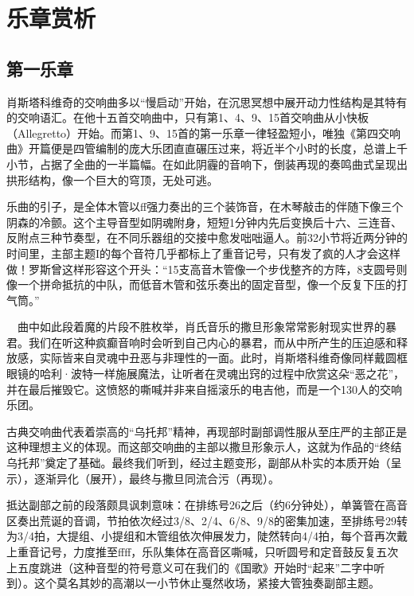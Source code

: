 \documentclass[a4paper,left=2.5cm,right=2.5cm,11pt]{article}
\begin{document}
\section{乐章赏析}
\subsection{第一乐章}
	肖斯塔科维奇的交响曲多以“慢启动”开始，在沉思冥想中展开动力性结构是其特有的交响语汇。在他十五首交响曲中，只有第1、4、9、15首交响曲从小快板（Allegretto）开始。而第1、9、15首的第一乐章一律轻盈短小，唯独《第四交响曲》开篇便是四管编制的庞大乐团直直碾压过来，将近半个小时的长度，总谱上千小节，占据了全曲的一半篇幅。在如此阴霾的音响下，倒装再现的奏鸣曲式呈现出拱形结构，像一个巨大的穹顶，无处可逃。\par

	乐曲的引子，是全体木管以ff强力奏出的三个装饰音，在木琴敲击的伴随下像三个阴森的冷颤。这个主导音型如阴魂附身，短短1分钟内先后变换后十六、三连音、反附点三种节奏型，在不同乐器组的交接中愈发咄咄逼人。前32小节将近两分钟的时间里，主部主题I的每个音符几乎都标上了重音记号，只有发了疯的人才会这样做！罗斯曾这样形容这个开头：“15支高音木管像一个步伐整齐的方阵，8支圆号则像一个拼命抵抗的中队，而低音木管和弦乐奏出的固定音型，像一个反复下压的打气筒。”\par

	　曲中如此段着魔的片段不胜枚举，肖氏音乐的撒旦形象常常影射现实世界的暴君。我们在听这种疯癫音响时会听到自己内心的暴君，而从中所产生的压迫感和释放感，实际皆来自灵魂中丑恶与非理性的一面。此时，肖斯塔科维奇像同样戴圆框眼镜的哈利·波特一样施展魔法，让听者在灵魂出窍的过程中欣赏这朵“恶之花”，并在最后摧毁它。这愤怒的嘶喊并非来自摇滚乐的电吉他，而是一个130人的交响乐团。\par

	古典交响曲代表着崇高的“乌托邦”精神，再现部时副部调性服从至庄严的主部正是这种理想主义的体现。而这部交响曲的主部以撒旦形象示人，这就为作品的“终结乌托邦”奠定了基础。最终我们听到，经过主题变形，副部从朴实的本质开始（呈示），逐渐异化（展开），最终与撒旦同流合污（再现）。\par

	抵达副部之前的段落颇具讽刺意味：在排练号26之后（约6分钟处），单簧管在高音区奏出荒诞的音调，节拍依次经过3/8、2/4、6/8、9/8的密集加速，至排练号29转为3/4拍，大提组、小提组和木管组依次伸展发力，陡然转向4/4拍，每个音再次戴上重音记号，力度推至ffff，乐队集体在高音区嘶喊，只听圆号和定音鼓反复五次上五度跳进（这种音型的符号意义可在我们的《国歌》开始时“起来”二字中听到）。这个莫名其妙的高潮以一小节休止戛然收场，紧接大管独奏副部主题。\par
\end{document}

